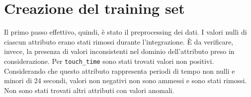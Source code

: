 \section{Creazione del training set}

Il primo passo effettivo, quindi, è stato il preprocessing dei dati. I valori nulli di ciascun attributo erano stati rimossi durante l’integrazione. È da verificare, invece, la presenza di valori inconsistenti nel dominio dell’attributo preso in considerazione.
Per \texttt{touch\_time} sono stati trovati valori non positivi. Considerando che questo attributo rappresenta periodi di tempo non nulli e minori di 24 secondi, valori non negativi non sono ammessi e sono stati rimossi.
Non sono stati trovati altri attributi con valori anomali.
